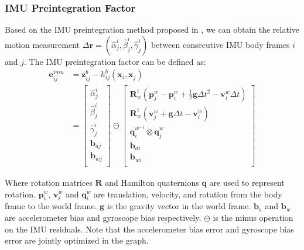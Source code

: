 \subsubsection{\textbf{IMU Preintegration Factor}}
Based on the IMU preintegration method proposed in \cite{forster2015imu}, we can obtain the relative motion measurement $\Delta \mathbf{r}=\left(\hat{\alpha}_{j}^{i}, \hat{\beta}_{j}^{i}, \hat{\gamma}_{j}^{{i}}\right)$ between consecutive IMU body frames $i$ and $j$. The IMU preintegration factor can be defined as:
\begin{equation}
	\label{eq:imu_factor}
	\begin{aligned}
		\mathbf{e}_{ij}^{{imu}}&=\mathbf{z}_{ij}^{b}-h_{ij}^{b}\left(\mathbf{x}_{i}, \mathbf{x}_{j}\right) \\
		&=\left[\begin{array}{c}
			\hat{\alpha}_{j}^{i}\\
			\hat{\beta}_{j}^{i} \\
			\hat{\gamma}_{j}^{i} \\
			\mathbf{b}_{a {j}} \\
			\mathbf{b}_{w {j}}\\ 
		\end{array}\right] \ominus\left[\begin{array}{c}
			\mathbf{R}_{w}^{i}\left(\mathbf{p}_{j}^{w}-\mathbf{p}_{i}^{w}+\frac{1}{2} \mathbf{g}\Delta t^{2}-\mathbf{v}_{i}^{w} \Delta t\right) \\
			\mathbf{R}_{w}^{i}\left(\mathbf{v}_{j}^{w}+\mathbf{g} \Delta t-\mathbf{v}_{i}^{w}\right)\\
			\mathbf{q}_{i}^{w_{}^{-1}} \otimes \mathbf{q}_{j}^{w_{}}\\
			\mathbf{b}_{a {i}}\\
			\mathbf{b}_{w {i}}\\
		\end{array}\right]
	\end{aligned}
\end{equation}

Where rotation matrices $\mathbf{R}$ and Hamilton quaternions $\mathbf{q} $ are used to represent rotation. $\mathbf{p}_{i}^{w}$, $\mathbf{v}_{i}^{w}$ and $\mathbf{q}_{i}^{w}$ are translation, velocity, and rotation from the body frame to the world frame. $\mathbf{g}$ is the gravity vector in the world frame.
$\mathbf{b}_{a}$ and $\mathbf{b}_{w}$ are accelerometer bias and gyroscope bias respectively. $\ominus$ is the minus operation on the IMU residuals.  
Note that the accelerometer bias error and gyroscope bias error are jointly optimized in the graph.   

